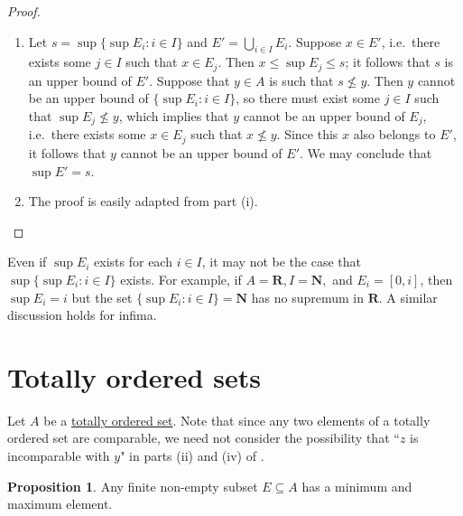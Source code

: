 \documentclass[12pt]{article}
\theoremstyle{definition}
\newtheorem{proposition}[definition]{Proposition}
\newcommand{\N}{\mathbf{N}}
\newcommand{\R}{\mathbf{R}}
\begin{document}
\begin{proof}
    \begin{enumerate}[label = (\roman*)]
        \item Let \( s = \sup \{ \sup E_i : i \in I \} \) and \( E' = \bigcup_{i \in I} E_i \). Suppose \( x \in E' \), i.e.\ there exists some \( j \in I \) such that \( x \in E_j \). Then \( x \leq \sup E_j \leq s \); it follows that \( s \) is an upper bound of \( E' \). Suppose that \( y \in A \)  is such that \( s \not\leq y \). Then \( y \) cannot be an upper bound of \( \{ \sup E_i : i \in I \} \), so there must exist some \( j \in I \) such that \( \sup E_j \not\leq y \), which implies that \( y \) cannot be an upper bound of \( E_j \), i.e.\ there exists some \( x \in E_j \) such that \( x \not\leq y \). Since this \( x \) also belongs to \( E' \), it follows that \( y \) cannot be an upper bound of \( E' \). We may conclude that \( \sup E' = s \).

        \item The proof is easily adapted from part (i). \qedhere
    \end{enumerate}
\end{proof}

Even if \( \sup E_i \) exists for each \( i \in I \), it may not be the case that \( \sup \{ \sup E_i : i \in I \} \) exists. For example, if \( A = \R, I = \N, \) and \( E_i = [0, i] \), then \( \sup E_i = i \) but the set \( \{ \sup E_i : i \in I \} = \N \) has no supremum in \( \R \). A similar discussion holds for infima.

\section{Totally ordered sets}
\label{sec:totally_ordered_sets}

Let \( A \) be a \href{https://en.wikipedia.org/wiki/Total_order}{totally ordered set}. Note that since any two elements of a totally ordered set are comparable, we need not consider the possibility that ``\( z \) is incomparable with \( y \)" in parts (ii) and (iv) of .

\begin{proposition}
\label{prop:finite_set_has_min_max_total_order}
    Any finite non-empty subset \( E \subseteq A \) has a minimum and maximum element.
\end{proposition}
\end{document}
